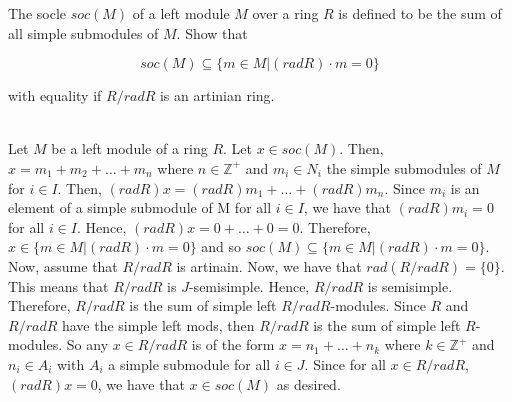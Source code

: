 The socle $soc(M)$ of a left module $M$ over a ring $R$ is defined to be the sum of all simple
submodules of $M$. Show that

$$soc(M)\subseteq\{m\in M|(rad R)\cdot m=0\}$$

with equality if $R/rad R$ is an artinian ring.\\

\begin{solution}\renewcommand{\qedsymbol}{}\ \\
    Let $M$ be a left module of a ring $R$. Let $x\in soc(M)$. Then, $x=m_1+m_2+\ldots+m_n$ where
    $n\in\mathbb{Z}^+$ and $m_i\in N_i$ the simple submodules of $M$ for $i\in I$. Then,
    $(rad R)x=(rad R)m_1+\ldots+(rad R)m_n$. Since $m_i$ is an element of a simple submodule of M for
    all $i\in I$, we have that $(rad R)m_i=0$ for all $i\in I$. Hence, $(rad R)x=0+\ldots+0=0$.
    Therefore, $x\in\{m\in M|(rad R)\cdot m=0\}$ and so $soc(M)\subseteq\{m\in M|(rad R)\cdot m=0\}$.
    Now, assume that $R/rad R$ is artinain. Now, we have that $rad(R/rad R)=\{0\}$. This means that
    $R/rad R$ is $J$-semisimple. Hence, $R/rad R$ is semisimple. Therefore, $R/rad R$ is the sum of
    simple left $R/rad R$-modules. Since $R$ and $R/rad R$ have the simple left mods, then $R/rad R$ is
    the sum of simple left $R$-modules. So any $x\in R/rad R$ is of the form $x=n_1+\ldots+n_k$ where
    $k\in\mathbb{Z}^+$ and $n_i\in A_i$ with $A_i$ a simple submodule for all $i\in J$. Since for all
    $x\in R/rad R$, $(rad R)x=0$, we have that $x\in soc(M)$ as desired.

\end{solution}